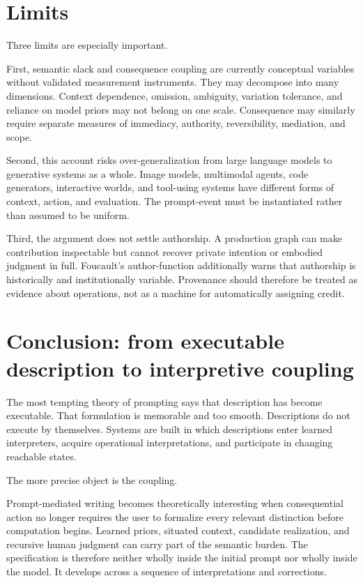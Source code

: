 \documentclass[11pt]{article}
\begin{document}
\section{Limits}

Three limits are especially important.

First, semantic slack and consequence coupling are currently conceptual variables without validated measurement instruments. They may decompose into many dimensions. Context dependence, omission, ambiguity, variation tolerance, and reliance on model priors may not belong on one scale. Consequence may similarly require separate measures of immediacy, authority, reversibility, mediation, and scope.

Second, this account risks over-generalization from large language models to generative systems as a whole. Image models, multimodal agents, code generators, interactive worlds, and tool-using systems have different forms of context, action, and evaluation. The prompt-event must be instantiated rather than assumed to be uniform.

Third, the argument does not settle authorship. A production graph can make contribution inspectable but cannot recover private intention or embodied judgment in full. Foucault's author-function additionally warns that authorship is historically and institutionally variable. Provenance should therefore be treated as evidence about operations, not as a machine for automatically assigning credit.

\section{Conclusion: from executable description to interpretive coupling}

The most tempting theory of prompting says that description has become executable. That formulation is memorable and too smooth. Descriptions do not execute by themselves. Systems are built in which descriptions enter learned interpreters, acquire operational interpretations, and participate in changing reachable states.

The more precise object is the coupling.

Prompt-mediated writing becomes theoretically interesting when consequential action no longer requires the user to formalize every relevant distinction before computation begins. Learned priors, situated context, candidate realization, and recursive human judgment can carry part of the semantic burden. The specification is therefore neither wholly inside the initial prompt nor wholly inside the model. It develops across a sequence of interpretations and corrections.
\end{document}
